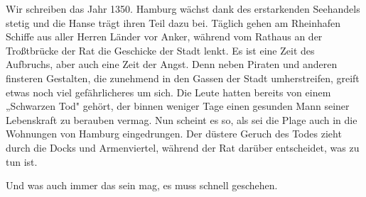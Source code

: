 
Wir schreiben das Jahr 1350. Hamburg wächst dank des erstarkenden Seehandels stetig und die Hanse trägt ihren Teil dazu bei. Täglich gehen am Rheinhafen Schiffe aus aller Herren Länder vor Anker, während vom Rathaus an der Troßtbrücke der Rat die Geschicke der Stadt lenkt. Es ist eine Zeit des Aufbruchs, aber auch eine Zeit der Angst. Denn neben Piraten und anderen finsteren Gestalten, die zunehmend in den Gassen der Stadt umherstreifen, greift etwas noch viel gefährlicheres um sich. Die Leute hatten bereits von einem „Schwarzen Tod" gehört, der binnen weniger Tage einen gesunden Mann seiner Lebenskraft zu berauben vermag. Nun scheint es so, als sei die Plage auch in die Wohnungen von Hamburg eingedrungen. Der düstere Geruch des Todes zieht durch die Docks und Armenviertel, während der Rat darüber entscheidet, was zu tun ist.

Und was auch immer das sein mag, es muss schnell geschehen.
